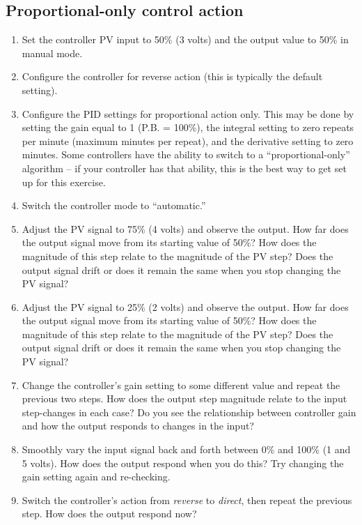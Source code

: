 \filbreak
\subsection{Proportional-only control action}

\begin{enumerate}
\item Set the controller PV input to 50\% (3 volts) and the output value to 50\% in manual mode.
\item Configure the controller for reverse action (this is typically the default setting).
\item Configure the PID settings for proportional action only.  This may be done by setting the gain equal to 1 (P.B. = 100\%), the integral setting to zero repeats per minute (maximum minutes per repeat), and the derivative setting to zero minutes.  Some controllers have the ability to switch to a ``proportional-only'' algorithm -- if your controller has that ability, this is the best way to get set up for this exercise.
\item Switch the controller mode to ``automatic.''
\item Adjust the PV signal to 75\% (4 volts) and observe the output.  How far does the output signal move from its starting value of 50\%?  How does the magnitude of this step relate to the magnitude of the PV step?  Does the output signal drift or does it remain the same when you stop changing the PV signal?
\item Adjust the PV signal to 25\% (2 volts) and observe the output.  How far does the output signal move from its starting value of 50\%?  How does the magnitude of this step relate to the magnitude of the PV step?  Does the output signal drift or does it remain the same when you stop changing the PV signal?
\item Change the controller's gain setting to some different value and repeat the previous two steps.  How does the output step magnitude relate to the input step-changes in each case?  Do you see the relationship between controller gain and how the output responds to changes in the input?
\item Smoothly vary the input signal back and forth between 0\% and 100\% (1 and 5 volts).  How does the output respond when you do this?  Try changing the gain setting again and re-checking.
\item Switch the controller's action from \textit{reverse} to \textit{direct}, then repeat the previous step.  How does the output respond now?
\end{enumerate}








